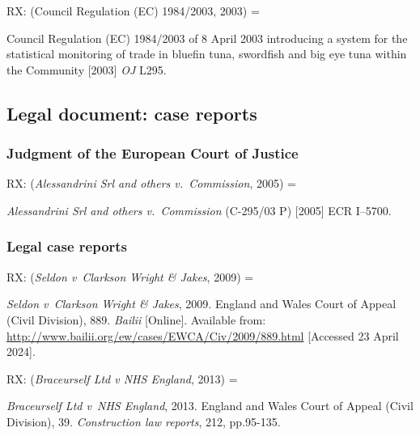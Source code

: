 RX: (Council Regulation (EC) 1984/2003, 2003) = \cite{eu.dir1984/2003}

Council Regulation (EC) 1984/2003 of 8 April 2003 introducing a system for the statistical monitoring of trade in bluefin tuna, swordfish and big eye tuna within the Community [2003] \emph{OJ} L295.



\subsection{Legal document: case reports}

\subsubsection*{Judgment of the European Court of Justice}

RX: (\emph{Alessandrini Srl and others v.~Commission}, 2005) = \cite{srl.etal-v-comm2005}

\emph{Alessandrini Srl and others v.~Commission} (C-295/03 P) [2005] ECR I--5700.



\subsubsection*{Legal case reports}

RX: (\emph{Seldon v~Clarkson Wright \& Jakes}, 2009) = \cite{seldon-v-c.w.j2009}

\emph{Seldon v~Clarkson Wright \& Jakes}, 2009. England and Wales Court of Appeal (Civil Division), 889. \emph{Bailii} [Online]. Available from: \url{http://www.bailii.org/ew/cases/EWCA/Civ/2009/889.html} [Accessed 23 April 2024].


RX: (\emph{Braceurself Ltd v NHS England}, 2013) = \cite{braceurself-v-nhs.england2013}

\emph{Braceurself Ltd v~NHS England}, 2013. England and Wales Court of Appeal (Civil Division), 39. \emph{Construction law reports}, 212, pp.95-135.


